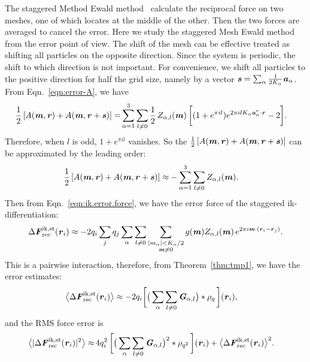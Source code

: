\documentclass[aps,pre,preprint]{revtex4}
\renewcommand{\v}[1]{\textbf{\textit{#1}}}
\begin{document}
The staggered Method Ewald method~\cite{cerutti2009staggered,
  neelov2010interlaced} calculate the reciprocal force on two meshes,
one of which locates at the middle of the other.  Then the two forces
are averaged to cancel the error. Here we study the staggered Mesh
Ewald method from the error point of view.
The shift of the mesh can be effective treated as shifting all
particles on the opposite direction. Since the system is periodic, the
shift to which direction is not important. For convenience, we shift
all particles to the positive direction for half the grid size, namely
by a vector $\v s = \sum_\alpha\frac1{2K_\alpha}\v a_\alpha$. From
Eqn.~\eqref{eqn:error-A}, we have
\begin{align}
  \frac12\, [A(\v m, \v r) + A(\v m, \v r+\v s)]
  =&
  \sum_{\alpha=1}^3\sum_{l\neq 0}
  \frac12\,
  Z_{\alpha,l}(\v m)\,
  \bigg[
  (1 + e^{\pi i l})e^{2\pi i l K_\alpha\v a^\ast_\alpha\cdot \v r} - 2
  \bigg].
\end{align}
Therefore, when $l$ is odd, $1 + e^{\pi i l}$ vanishes. So the $\frac12\,[A(\v
m, \v r) + A(\v m, \v r+\v s)]$ can be approximated by the leading
order:
\begin{align}
  \frac12\, [A(\v m, \v r) + A(\v m, \v r+\v s)]
  \approx&
  -\sum_{\alpha=1}^3\sum_{l\neq 0}
  Z_{\alpha,l}(\v m).
\end{align}
Then from Eqn.~\eqref{eqn:ik.error.force}, we have the error force of
the staggered ik-differentiation:
\begin{align}
  \Delta\v F^{\textrm{ik,st}}_{\textrm{rec}}(\v r_i)
  \approx -2q_i
  \sum_jq_j
  \sum_\alpha\sum_{l\neq 0}
  \sum_{
    \begin{subarray}{c}
      \vert m_{\alpha}\vert < K_\alpha/2\\
      \v m\neq 0
    \end{subarray}}
  g(\v m) Z_{\alpha,l}(\v m)\,e^{2\pi i\v m\cdot(\v r_i-\v r_j)}.
\end{align}
This is a pairwise interaction, therefore, from
Theorem~\ref{thm:tmp1}, we have the error estimates:
\begin{align}\label{eqn:ik.st.meanf}
  \big\langle
  \Delta\v F_{\textrm{rec}}^{\textrm{ik,st}}(\v r_i)
  \big\rangle
  & \approx
  - 2 q_i
  \bigg[
  \big(
  \sum_{\alpha}\sum_{l\neq 0}\v G_{\alpha,l}
  \big)
  \ast\rho_q\,
  \bigg] (\v r_i),
\end{align}
and the RMS force error is 
\begin{align}\label{eqn:ik.st.error}
  \big\langle
  \vert\Delta\v F_{\textrm{rec}}^{\textrm{ik,st}}(\v r_i)\vert^2
  \big\rangle
  \approx&\,
  4q_i^2\,
  \bigg[
  \big(
  \sum_{\alpha} \sum_{l\neq 0}  
  \v G_{\alpha,l}
  \big)^2
  \ast \rho_{q^2}\,
  \bigg] (\v r_i) +
  \big\langle
  \Delta\v F_{\textrm{rec}}^{\textrm{ik,st}}(\v r_i)
  \big\rangle^2.
\end{align}
\end{document}
